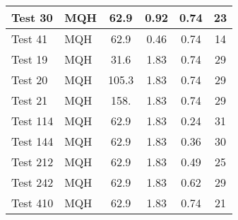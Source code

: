 \begin{table}[!ht]
\begin{center}
\begin{tabular}{|l|l|c|c|c|c|}
Test 30    &  MQH               &  62.9           &  0.92            &  0.74            &  23                 \\ \hline
Test 41    &  MQH               &  62.9           &  0.46            &  0.74            &  14                 \\ \hline
Test 19    &  MQH               &  31.6           &  1.83            &  0.74            &  29                 \\ \hline
Test 20    &  MQH               &  105.3          &  1.83            &  0.74            &  29                 \\ \hline
Test 21    &  MQH               &  158.           &  1.83            &  0.74            &  29                 \\ \hline
Test 114   &  MQH               &  62.9           &  1.83            &  0.24            &  31                 \\ \hline
Test 144   &  MQH               &  62.9           &  1.83            &  0.36            &  30                 \\ \hline
Test 212   &  MQH               &  62.9           &  1.83            &  0.49            &  25                 \\ \hline
Test 242   &  MQH               &  62.9           &  1.83            &  0.62            &  29                 \\ \hline
Test 410   &  MQH               &  62.9           &  1.83            &  0.74            &  21                 \\ \hline
\end{tabular}
\end{center}
\end{table}

